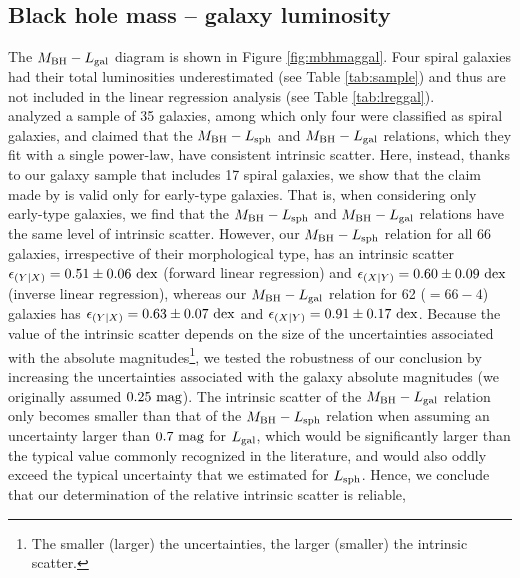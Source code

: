 \documentclass[preprint2]{emulateapj}
\begin{document}
\subsection{Black hole mass -- galaxy luminosity}
The $M_{\rm BH} - L_{\rm gal}$ diagram is shown in Figure \ref{fig:mbhmaggal}.
Four spiral galaxies had their total luminosities underestimated (see Table \ref{tab:sample}) 
and thus are not included in the linear regression analysis (see Table \ref{tab:lreggal}). \\
\cite{lasker2014anal} analyzed a sample of 35 galaxies, among which only four were classified as spiral galaxies, 
and claimed that the $M_{\rm BH} - L_{\rm sph}$ and $M_{\rm BH} - L_{\rm gal}$ relations, 
which they fit with a single power-law, have consistent intrinsic scatter.
Here, instead, thanks to our galaxy sample that includes 17 spiral galaxies, 
we show that the claim made by \cite{lasker2014anal} is valid only for early-type galaxies. 
That is, when considering only early-type galaxies, 
we find that the $M_{\rm BH} - L_{\rm sph}$ and $M_{\rm BH} - L_{\rm gal}$ relations have the same level of intrinsic scatter. 
However, our $M_{\rm BH} - L_{\rm sph}$ relation for all 66 galaxies, irrespective of their morphological type, 
has an intrinsic scatter $\epsilon_{(Y|X)} = 0.51 \pm 0.06\rm~dex$ (forward linear regression) 
and $\epsilon_{(X|Y)} = 0.60 \pm 0.09\rm~dex$ (inverse linear regression), 
whereas our $M_{\rm BH} - L_{\rm gal}$ relation for 62 ($=66-4$) galaxies has $\epsilon_{(Y|X)} = 0.63 \pm 0.07\rm~dex$ 
and $\epsilon_{(X|Y)} = 0.91 \pm 0.17\rm~dex$.
Because the value of the intrinsic scatter depends on the size of the uncertainties associated with the absolute magnitudes\footnote{The 
smaller (larger) the uncertainties, the larger (smaller) the intrinsic scatter.}, 
we tested the robustness of our conclusion by increasing the uncertainties associated with the galaxy absolute magnitudes 
(we originally assumed $0.25\rm~mag$).
The intrinsic scatter of the $M_{\rm BH} - L_{\rm gal}$ relation only becomes smaller than that of the $M_{\rm BH} - L_{\rm sph}$ relation 
when assuming an uncertainty larger than $0.7\rm~mag$ for $L_{\rm gal}$, 
which would be significantly larger than the typical value commonly recognized in the literature, 
and would also oddly exceed the typical uncertainty that we estimated for $L_{\rm sph}$. 
Hence, we conclude that our determination of the relative intrinsic scatter is reliable, 
\end{document}
